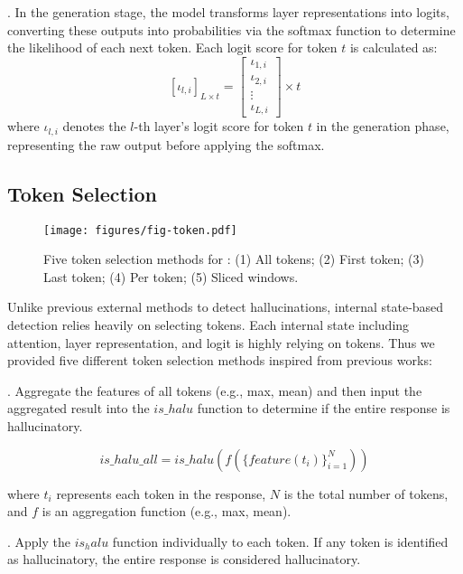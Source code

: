 .
In the generation stage, the model transforms layer representations into logits, converting these outputs into probabilities via the softmax function to determine the likelihood of each next token. Each logit score for token \( t \) is calculated as:
\begin{equation}
    \left[ \iota _{l,i} \right]_{L \times t}=\begin{bmatrix}
    \iota _{1,i} \\
    \iota _{2,i} \\
    \vdots \\
    \iota _{L,i}
    \end{bmatrix}\times t
\end{equation}
where \( \iota _{l,i} \) denotes the \( l \)-th layer’s logit score for token \( t \) in the generation phase, representing the raw output before applying the softmax.

\subsection{Token Selection}\label{sec:scheme:token_select}

\begin{figure*}[htbp]
    \centering
    \texttt{[image: figures/fig-token.pdf]}
    \caption{
    Five token selection methods for \sysname:
    (1) All tokens;
    (2) First token;
    (3) Last token;
    (4) Per token;
    (5) Sliced windows.
    }
    \label{fig:token}
\end{figure*}

Unlike previous external methods to detect hallucinations, internal state-based detection relies heavily on selecting tokens.
Each internal state including attention, layer representation, and logit is highly relying on tokens.
Thus we provided five different token selection methods inspired from previous works:

.
Aggregate the features of all tokens (e.g., max, mean) and then input the aggregated result into the $is\_halu$ function to determine if the entire response is hallucinatory.

\[
is\_halu\_all = is\_halu\left(f\left(\{feature(t_i)\}_{i=1}^{N}\right)\right)
\]

where \( t_i \) represents each token in the response, \( N \) is the total number of tokens, and \( f \) is an aggregation function (e.g., max, mean).


.
Apply the $is_halu$ function individually to each token. If any token is identified as hallucinatory, the entire response is considered hallucinatory.

